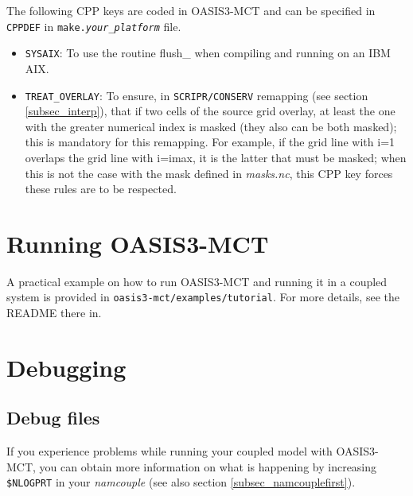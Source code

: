 The following CPP keys are coded in OASIS3-MCT and
can be specified in {\tt CPPDEF} in {\tt make.{\it your\_platform}} file.

\begin{itemize}

\item {\tt SYSAIX}: To use the routine flush\_ when compiling and running on an IBM AIX.

\item {\tt TREAT\_OVERLAY}: To ensure, in {\tt SCRIPR/CONSERV} remapping (see section
  \ref{subsec_interp}), that if two cells of the source grid overlay,
  at least the one with the greater numerical index is masked (they
  also can be both masked); this is mandatory for this remapping. For
  example, if the grid line with i=1 overlaps the grid line with
  i=imax, it is the latter that must be masked; when this is not the
  case with the mask defined in {\it masks.nc}, this CPP key forces
  these rules are to be respected.
\end{itemize}

\section{Running OASIS3-MCT}
\label{subsec_running}

A practical example on how to run OASIS3-MCT and running it in a
coupled system is provided in {\tt oasis3-mct/examples/tutorial}. For
more details, see the README there in.

\section{Debugging}
\label{subsec_debug}

\subsection{Debug files}
If you experience problems while running your coupled model with
OASIS3-MCT, you can obtain more information on what is happening by increasing {\tt \$NLOGPRT} 
in your {\it namcouple} (see also section \ref{subsec_namcouplefirst}).

